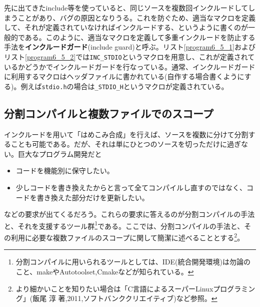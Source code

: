先に出てきたinclude等を使っていると、同じソースを複数回インクルードしてしまうことがあり、バグの原因となりうる。これを防ぐため、適当なマクロを定義して、それが定義されていなければインクルードする、というように書くのが一般的である。このように、適当なマクロを定義して多重インクルードを防止する手法を\textbf{インクルードガード}(include guard)と呼ぶ。リスト\ref{program6_5_1}およびリスト\ref{program6_5_2}では\verb|INC_STDIO|というマクロを用意し、これが定義されているかどうかでインクルードガードを行なっている。通常、インクルードガードに利用するマクロはヘッダファイルに書かれている(自作する場合書くようにする)。例えば\verb|stdio.h|の場合は\verb|_STDIO_H|というマクロが定義されている。

\subsection{分割コンパイルと複数ファイルでのスコープ}
インクルードを用いて「はめこみ合成」を行えば、ソースを複数に分けて分割することも可能である。だが、それは単にひとつのソースを切っただけに過ぎない。巨大なプログラム開発だと
\begin{itemize}
\item コードを機能別に保守したい。
\item 少しコードを書き換えたからと言って全てコンパイルし直すのではなく、コードを書き換えた部分だけを更新したい。
\end{itemize}
などの要求が出てくるだろう。これらの要求に答えるのが分割コンパイルの手法と、それを支援するツール群\footnote{分割コンパイルに用いられるツールとしては、IDE(統合開発環境)は勿論のこと、makeやAutotoolset,Cmakeなどが知られている。}である。ここでは、分割コンパイルの手法と、その利用に必要な複数ファイルのスコープに関して簡潔に述べることとする\footnote{より細かいことを知りたい場合は「C言語によるスーパーLinuxプログラミング」(飯尾 淳 著,2011,ソフトバンククリエイティブ)など参照。}。

